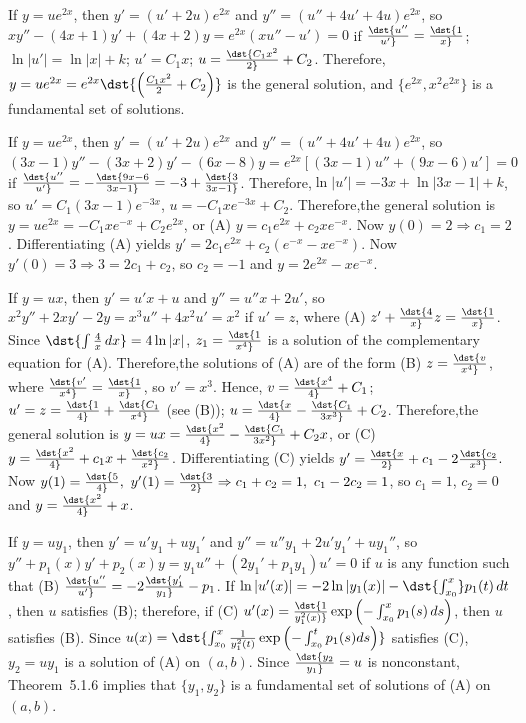 \documentclass[dvips]{book}
\renewcommand{\exer}[1]{\par\medskip\;\noindent{\color{red}\bf #1.}}
\numberwithin{example}{section}
\numberwithin{equation}{section}
\numberwithin{theorem}{section}
\numberwithin{table}{section}
\numberwithin{figure}{section}
\begin{document}
\exer{5.6.30}
If $y=ue^{2x}$, then $y'=(u'+2u)e^{2x}$ and $y''=(u''+4u'+4u)e^{2x}$,
so $xy''-(4x+1)y'+(4x+2)y =e^{2x}(xu''-u')=0$ if $\dst{u''\over
u'}=\dst{1\over x}$;\ $\ln|u'|=\ln|x|+k$; $u'=C_1x$;\;
$u=\dst{C_1x^2\over 2}+C_2$. Therefore,
$y=ue^{2x}=e^{2x}\dst{\left({C_1x^2\over2}+C_2\right)}$ is the general
solution, and $\{e^{2x},x^2e^{2x}\}$ is a fundamental set of
solutions.




\exer{5.6.32}
If $y=ue^{2x}$, then $y'=(u'+2u)e^{2x}$ and $y''=(u''+4u'+4u)e^{2x}$,
so
$(3x-1)y''-(3x+2)y'-(6x-8)y=e^{2x}\left[(3x-1)u''+(9x-6)u'\right]=0$
if $\dst{u''\over u'}=-\dst{9x-6\over3x-1}=-3+\dst{3\over3x-1}$.
Therefore,$\ln|u'|=-3x+\ln|3x-1|+k$, so $u'=C_1(3x-1)e^{-3x}$,
$u=-C_1xe^{-3x}+C_2$. Therefore,the general solution is
$y=ue^{2x}=-C_1xe^{-x}+C_2e^{2x}$, or (A) $y=c_1e^{2x}+c_2xe^{-x}$.
Now $y(0)=2\Rightarrow c_1=2$. Differentiating (A) yields
$y'=2c_1e^{2x}+c_2(e^{-x}-xe^{-x})$. Now $y'(0)=3\Rightarrow
3=2c_1+c_2$, so $c_2=-1$ and $y=2e^{2x}-xe^{-x}$.


\exer{5.6.34}
If $y=ux$, then $y'=u'x+u$  and $y''=u''x+2u'$, so
$x^2y''+2xy'-2y=x^3u''+4x^2u'=x^2$
if $u'=z$, where  (A) $z'+\dst{4\over x}z=\dst{1\over x}$.
Since $\dst{\int{4\over x}\,dx}=4\ln|x|$,
$z_1=\dst{1\over x^4}$
is a solution of the complementary equation for  (A). Therefore,the
solutions of (A) are of the form (B) $z=\dst{v\over x^4}$, where
$\dst{v'\over x^4}=\dst{1\over x}$, so $v'=x^3$.
Hence, $v=\dst{x^4\over 4}+C_1$;\;
$u'=z=\dst{1\over4}+\dst{C_1\over x^4}$ (see (B));\;
$u=\dst{x\over4}-\dst{C_1\over3x^3}+C_2$.
 Therefore,the general solution is
$y=ux=\dst{x^2\over4}-\dst{C_1\over3x^2}+C_2x$, or
(C) $y=\dst{x^2\over4}+c_1x+\dst{c_2\over x^2}$.
Differentiating (C) yields
 $y'=\dst{x\over2}+c_1-2\dst{c_2\over x^3}.$
Now $y(1)=\dst{5\over4},\ y'(1)=\dst{3\over2}\Rightarrow
c_1+c_2=1,\ c_1-2c_2=1$, so $c_1=1$, $c_2=0$ and
$y=\dst{x^2\over4}+x$.




\exer{5.6.36}
If $y=uy_1$, then $y'=u'y_1+uy_1'$  and $y''=u''y_1+2u'y_1'+uy_1''$,
so  $y''+p_1(x)y'+p_2(x)y=y_1u''+(2y_1'+p_1y_1)u'=0$ if $u$
is any function such that
(B) $\dst{u''\over u'}=-2\dst{y_1'\over y_1}-p_1$. If
 $\ln|u'(x)|=-2\ln|y_1(x)|-\dst{\int_{x_0}^x} p_1(t)\,dt$,
then $u$ satisfies (B); therefore, if
(C) $u'(x)=\dst{1\over y_1^2(x)}\exp\left(-\int_{x_0}^x
p_1(s)\,ds\right)$, then $u$ satisfies (B).
Since $u(x)=\dst{\int^x_{x_0}{1\over y^2_1(t)} \exp
\left(-\int^t_{x_0}p_1(s) ds\right)}$ satisfies (C), $y_2=uy_1$ is a
solution of (A) on $(a,b)$. Since $\dst{y_2\over y_1}=u$ is
nonconstant, Theorem~5.1.6 implies that $\{y_1,y_2\}$ is a
fundamental set of solutions of (A) on $(a,b)$.
\end{document}
